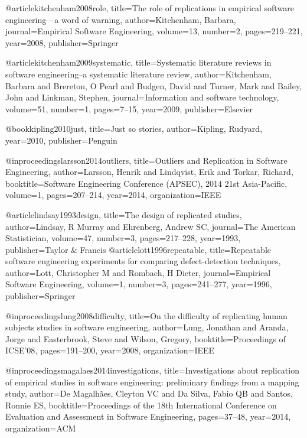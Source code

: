 @article{kitchenham2008role,
  title={The role of replications in empirical software engineering—a word of warning},
  author={Kitchenham, Barbara},
  journal={Empirical Software Engineering},
  volume={13},
  number={2},
  pages={219--221},
  year={2008},
  publisher={Springer}
}

@article{kitchenham2009systematic,
  title={Systematic literature reviews in software engineering--a systematic literature review},
  author={Kitchenham, Barbara and Brereton, O Pearl and Budgen, David and Turner, Mark and Bailey, John and Linkman, Stephen},
  journal={Information and software technology},
  volume={51},
  number={1},
  pages={7--15},
  year={2009},
  publisher={Elsevier}
}


@book{kipling2010just,
  title={Just so stories},
  author={Kipling, Rudyard},
  year={2010},
  publisher={Penguin}
}

@inproceedings{larsson2014outliers,
  title={Outliers and Replication in Software Engineering},
  author={Larsson, Henrik and Lindqvist, Erik and Torkar, Richard},
  booktitle={Software Engineering Conference (APSEC), 2014 21st Asia-Pacific},
  volume={1},
  pages={207--214},
  year={2014},
  organization={IEEE}
}

@article{lindsay1993design,
  title={The design of replicated studies},
  author={Lindsay, R Murray and Ehrenberg, Andrew SC},
  journal={The American Statistician},
  volume={47},
  number={3},
  pages={217--228},
  year={1993},
  publisher={Taylor \& Francis}
}
@article{lott1996repeatable,
  title={Repeatable software engineering experiments for comparing defect-detection techniques},
  author={Lott, Christopher M and Rombach, H Dieter},
  journal={Empirical Software Engineering},
  volume={1},
  number={3},
  pages={241--277},
  year={1996},
  publisher={Springer}
}

@inproceedings{lung2008difficulty,
  title={On the difficulty of replicating human subjects studies in software engineering},
  author={Lung, Jonathan and Aranda, Jorge and Easterbrook, Steve and Wilson, Gregory},
  booktitle={Proceedings of ICSE'08},
  pages={191--200},
  year={2008},
  organization={IEEE}
}

@inproceedings{magalaes2014investigations,
  title={Investigations about replication of empirical studies in software engineering: preliminary findings from a mapping study},
  author={De Magalh{\~a}es, Cleyton VC and Da Silva, Fabio QB and Santos, Ronnie ES},
  booktitle={Proceedings of the 18th International Conference on Evaluation and Assessment in Software Engineering},
  pages={37--48},
  year={2014},
  organization={ACM}
}


